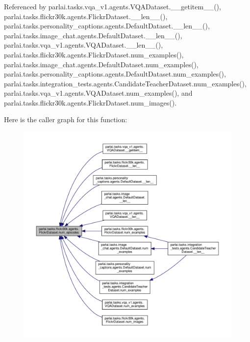 Referenced by parlai.\+tasks.\+vqa\+\_\+v1.\+agents.\+V\+Q\+A\+Dataset.\+\_\+\+\_\+getitem\+\_\+\+\_\+(), parlai.\+tasks.\+flickr30k.\+agents.\+Flickr\+Dataset.\+\_\+\+\_\+len\+\_\+\+\_\+(), parlai.\+tasks.\+personality\+\_\+captions.\+agents.\+Default\+Dataset.\+\_\+\+\_\+len\+\_\+\+\_\+(), parlai.\+tasks.\+image\+\_\+chat.\+agents.\+Default\+Dataset.\+\_\+\+\_\+len\+\_\+\+\_\+(), parlai.\+tasks.\+vqa\+\_\+v1.\+agents.\+V\+Q\+A\+Dataset.\+\_\+\+\_\+len\+\_\+\+\_\+(), parlai.\+tasks.\+flickr30k.\+agents.\+Flickr\+Dataset.\+num\+\_\+examples(), parlai.\+tasks.\+image\+\_\+chat.\+agents.\+Default\+Dataset.\+num\+\_\+examples(), parlai.\+tasks.\+personality\+\_\+captions.\+agents.\+Default\+Dataset.\+num\+\_\+examples(), parlai.\+tasks.\+integration\+\_\+tests.\+agents.\+Candidate\+Teacher\+Dataset.\+num\+\_\+examples(), parlai.\+tasks.\+vqa\+\_\+v1.\+agents.\+V\+Q\+A\+Dataset.\+num\+\_\+examples(), and parlai.\+tasks.\+flickr30k.\+agents.\+Flickr\+Dataset.\+num\+\_\+images().

Here is the caller graph for this function\+:
\nopagebreak
\begin{figure}[H]
\begin{center}
\leavevmode
\includegraphics[width=350pt]{classparlai_1_1tasks_1_1flickr30k_1_1agents_1_1FlickrDataset_aa973995adc1552143c69474ead14fa59_icgraph}
\end{center}
\end{figure}
\mbox{\label{classparlai_1_1tasks_1_1flickr30k_1_1agents_1_1FlickrDataset_ad3996cb0eb8a94dbea616391eedc1caa}} 
